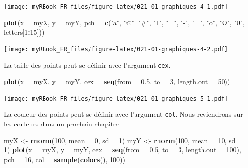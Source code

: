 \documentclass[
]{book}
\newenvironment{Shaded}{\begin{snugshade}}{\end{snugshade}}
\newcommand{\DataTypeTok}[1]{\textcolor[rgb]{0.13,0.29,0.53}{#1}}
\newcommand{\DecValTok}[1]{\textcolor[rgb]{0.00,0.00,0.81}{#1}}
\newcommand{\FloatTok}[1]{\textcolor[rgb]{0.00,0.00,0.81}{#1}}
\newcommand{\KeywordTok}[1]{\textcolor[rgb]{0.13,0.29,0.53}{\textbf{#1}}}
\newcommand{\NormalTok}[1]{#1}
\newcommand{\OperatorTok}[1]{\textcolor[rgb]{0.81,0.36,0.00}{\textbf{#1}}}
\newcommand{\StringTok}[1]{\textcolor[rgb]{0.31,0.60,0.02}{#1}}
\begin{document}
\texttt{[image: myRBook\_FR\_files/figure-latex/021-01-graphiques-4-1.pdf]}

\begin{Shaded}
\begin{Highlighting}[]
\KeywordTok{plot}\NormalTok{(}\DataTypeTok{x =}\NormalTok{ myX, }\DataTypeTok{y =}\NormalTok{ myY, }
  \DataTypeTok{pch =} \KeywordTok{c}\NormalTok{(}\StringTok{"a"}\NormalTok{, }\StringTok{"@"}\NormalTok{, }\StringTok{"#"}\NormalTok{, }\StringTok{"1"}\NormalTok{, }\StringTok{"="}\NormalTok{, }\StringTok{"-"}\NormalTok{, }\StringTok{"_"}\NormalTok{, }\StringTok{"o"}\NormalTok{, }\StringTok{"O"}\NormalTok{, }\StringTok{"0"}\NormalTok{, letters[}\DecValTok{1}\OperatorTok{:}\DecValTok{15}\NormalTok{]))}
\end{Highlighting}
\end{Shaded}

\texttt{[image: myRBook\_FR\_files/figure-latex/021-01-graphiques-4-2.pdf]}

La taille des points peut se définir avec l'argument \texttt{cex}.

\begin{Shaded}
\begin{Highlighting}[]
\KeywordTok{plot}\NormalTok{(}\DataTypeTok{x =}\NormalTok{ myX, }\DataTypeTok{y =}\NormalTok{ myY, }
  \DataTypeTok{cex =} \KeywordTok{seq}\NormalTok{(}\DataTypeTok{from =} \FloatTok{0.5}\NormalTok{, }\DataTypeTok{to =} \DecValTok{3}\NormalTok{, }\DataTypeTok{length.out =} \DecValTok{50}\NormalTok{))}
\end{Highlighting}
\end{Shaded}

\texttt{[image: myRBook\_FR\_files/figure-latex/021-01-graphiques-5-1.pdf]}

La couleur des points peut se définir avec l'argument \texttt{col}. Nous reviendrons sur les couleurs dans un prochain chapitre.

\begin{Shaded}
\begin{Highlighting}[]
\NormalTok{myX <-}\StringTok{ }\KeywordTok{rnorm}\NormalTok{(}\DecValTok{100}\NormalTok{, }\DataTypeTok{mean =} \DecValTok{0}\NormalTok{, }\DataTypeTok{sd =} \DecValTok{1}\NormalTok{)}
\NormalTok{myY <-}\StringTok{ }\KeywordTok{rnorm}\NormalTok{(}\DecValTok{100}\NormalTok{, }\DataTypeTok{mean =} \DecValTok{10}\NormalTok{, }\DataTypeTok{sd =} \DecValTok{1}\NormalTok{)}
\KeywordTok{plot}\NormalTok{(}\DataTypeTok{x =}\NormalTok{ myX, }\DataTypeTok{y =}\NormalTok{ myY, }
  \DataTypeTok{cex =} \KeywordTok{seq}\NormalTok{(}\DataTypeTok{from =} \FloatTok{0.5}\NormalTok{, }\DataTypeTok{to =} \DecValTok{3}\NormalTok{, }\DataTypeTok{length.out =} \DecValTok{100}\NormalTok{),}
  \DataTypeTok{pch =} \DecValTok{16}\NormalTok{,}
  \DataTypeTok{col =} \KeywordTok{sample}\NormalTok{(}\KeywordTok{colors}\NormalTok{(), }\DecValTok{100}\NormalTok{))}
\end{Highlighting}
\end{Shaded}
\end{document}
